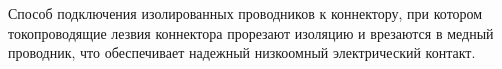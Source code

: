 Способ подключения изолированных проводников к
коннектору, при котором токопроводящие лезвия
коннектора прорезают изоляцию и врезаются в медный проводник,
что обеспечивает надежный низкоомный электрический контакт.